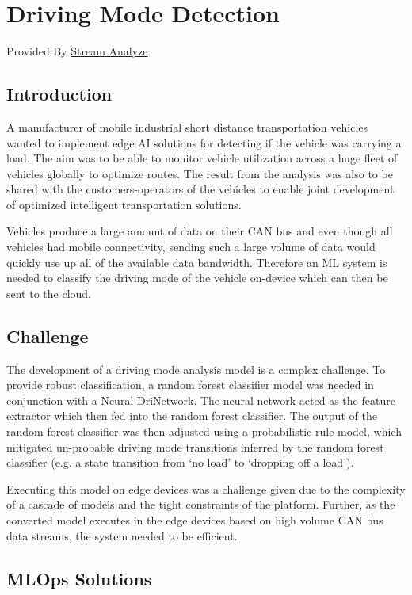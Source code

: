 {{{{{{\section{Driving Mode Detection}

Provided By \href{https://streamanalyze.com/}{Stream Analyze}

\subsection{Introduction}
A manufacturer of mobile industrial short distance transportation vehicles wanted to implement edge AI solutions for detecting if the vehicle was carrying a load. The aim was to be able to monitor vehicle utilization across a huge fleet of vehicles globally to optimize routes. The result from the analysis was also to be shared with the customers-operators of the vehicles to enable joint development of optimized intelligent transportation solutions.

Vehicles produce a large amount of data on their CAN bus and even though all vehicles had mobile connectivity, sending such a large volume of data would quickly use up all of the available data bandwidth. Therefore an ML system is needed to classify the driving mode of the vehicle on-device which can then be sent to the cloud.

\subsection{Challenge}

The development of a driving mode analysis model is a complex challenge. To provide robust classification, a random forest classifier model was needed in conjunction with a Neural DriNetwork. The neural network acted as the feature extractor which then fed into the random forest classifier. The output of the random forest classifier was then adjusted using a probabilistic rule model, which mitigated un-probable driving mode transitions inferred by the random forest classifier (e.g. a state transition from ‘no load’ to ‘dropping off a load’).

Executing this model on edge devices was a challenge given due to the complexity of a cascade of models and the tight constraints of the platform. Further, as the converted model executes in the edge devices based on high volume CAN bus data streams, the system needed to be efficient.

\subsection{MLOps Solutions}

}}}}}}
